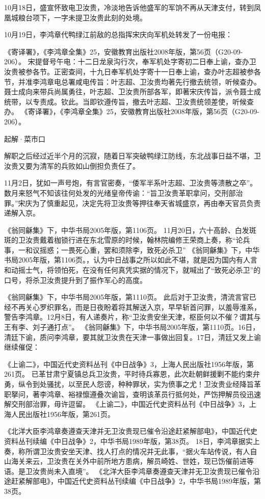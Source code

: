 \documentclass[12pt,UTF8]{ctexbook}
\begin{document}
10月18日，盛宣怀致电卫汝贵，冷淡地告诉他盛军的军饷不再从天津支付，转到凤凰城粮台项下，一字未提卫汝贵此刻的处境。

10月19日，李鸿章代鸭绿江前敌的总指挥宋庆向军机处转发了一份电报：

《寄译署》，《李鸿章全集》25，安徽教育出版社2008年版，第56页（G20-09-206）。
宋提督号午电：十二日龙泉沟行次，奉军机处字寄初二日奉上谕，查办卫汝贵被参各节。正密查间，十九日奉军机处字寄十一日奉上谕，查办叶志超被参各节，并准李鸿章电总署咸电传旨：叶志超、卫汝贵均著先行撤去统领，听候查办。聂士成向来带兵尚属勇往，叶志超、卫汝贵所部各军，即著宋庆传旨，派令聂士成统带，以专责成。钦此。当即钦遵传旨，撤去叶志超、卫汝贵统领差使，听候查办。 《寄译署》，《李鸿章全集》25，安徽教育出版社2008年版，第56页（G20-09-206）。

起解·菜市口

解职之后经过近半个月的沉寂，随着日军突破鸭绿江防线，东北战事日益不堪，卫汝贵又要为清军的兵败如山倒担负责任了。

11月2日，犹如一声号炮，有言官密奏，“倭军半系叶志超、卫汝贵等溃散之卒”。数月来怒气不知该往何处发的光绪皇帝传谕：“旨卫汝贵革职拿问，交刑部治罪。”宋庆为了慎重起见，决定先将卫汝贵等押往奉天省城盛京，再由奉天官员负责递解入京。

《翁同龢集》下，中华书局2005年版，第1106页。
11月20日，六十高龄、白发斑斑的卫汝贵戴着枷锁行进在东北雪原的时候，翰林院编修王荣商上奏，称“论兵事，一和议摇惑；一畏死心重，罢和须除李，致死必杀卫” 《翁同龢集》下，中华书局2005年版，第1106页。，认为中日战事之所以如此不堪，就是因为国内有人言和动摇士气，将领怕死，在没有任何真凭实据的情况下，就喊出了“致死必杀卫”的口号，将杀卫汝贵提升到了振作军心的高度。

《翁同龢集》下，中华书局2005年版，第1110页。
此后对于卫汝贵，清流言官已经不再关心罗织罪名，而是日夜盼着将其解送入京，早早斩首问罪，以羞辱淮系，警告李鸿章。12月8日，有人递奏片，称“卫汝贵安坐天津，枢臣何以不催？谓其与王有李、刘子通打点”。 《翁同龢集》下，中华书局2005年版，第1110页。16日，清廷下谕，质问李鸿章，要其就卫汝贵在天津一事做出回复。17日，清廷又发上谕继续催促：

《上谕二》，中国近代史资料丛刊《中日战争》3，上海人民出版社1956年版，第261页。
已革甘肃宁夏镇总兵卫汝贵，平时待兵寡恩，此次赴朝鲜援剿不能约束弁勇，纵令到处骚扰，以至民人怨谤，种种罪状，实为偾事之尤！卫汝贵业经降旨革职拏问，著李鸿章、裕禄懔遵叠次谕旨，查明该革员行抵何处，严饬押解员役迅速解交刑部治罪，毋许逗留。 《上谕二》，中国近代史资料丛刊《中日战争》3，上海人民出版社1956年版，第261页。

《北洋大臣李鸿章奏遵查天津并无卫汝贵现已催令沿途赶紧解部电》，中国近代史资料丛刊续编《中日战争》2，中华书局1989年版，第38页。
18日，李鸿章据实上奏，称所谓卫汝贵安坐天津、找人打点的情况并无此事，“据火车站传说，有人自山海关来云，卫汝贵在关外中前所地方患病，解员崎姓、世姓，现已饬催前进等语。是卫汝贵尚未入直境”。 《北洋大臣李鸿章奏遵查天津并无卫汝贵现已催令沿途赶紧解部电》，中国近代史资料丛刊续编《中日战争》2，中华书局1989年版，第38页。
\end{document}
